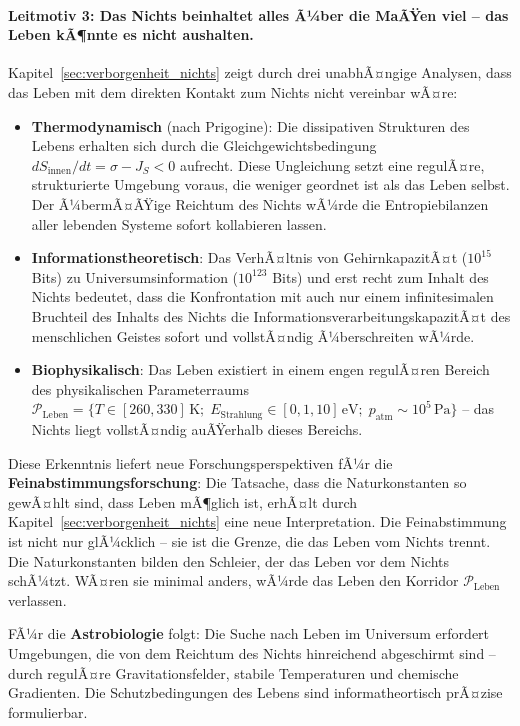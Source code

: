 ﻿\documentclass[12pt,a4paper]{report}
\begin{document}
\paragraph{Leitmotiv 3: Das Nichts beinhaltet alles Ã¼ber die MaÃŸen viel -- das Leben kÃ¶nnte es nicht aushalten.}

Kapitel~\ref{sec:verborgenheit_nichts} zeigt durch drei unabhÃ¤ngige Analysen, dass das Leben mit dem direkten Kontakt zum Nichts nicht vereinbar wÃ¤re:

\begin{itemize}
	\item \textbf{Thermodynamisch} (nach Prigogine): Die dissipativen Strukturen des Lebens erhalten sich durch die Gleichgewichtsbedingung $dS_{\text{innen}}/dt = \sigma - J_S < 0$ aufrecht. Diese Ungleichung setzt eine regulÃ¤re, strukturierte Umgebung voraus, die weniger geordnet ist als das Leben selbst. Der Ã¼bermÃ¤ÃŸige Reichtum des Nichts wÃ¼rde die Entropiebilanzen aller lebenden Systeme sofort kollabieren lassen.
	\item \textbf{Informationstheoretisch}: Das VerhÃ¤ltnis von GehirnkapazitÃ¤t ($10^{15}$ Bits) zu Universumsinformation ($10^{123}$ Bits) und erst recht zum Inhalt des Nichts bedeutet, dass die Konfrontation mit auch nur einem infinitesimalen Bruchteil des Inhalts des Nichts die InformationsverarbeitungskapazitÃ¤t des menschlichen Geistes sofort und vollstÃ¤ndig Ã¼berschreiten wÃ¼rde.
	\item \textbf{Biophysikalisch}: Das Leben existiert in einem engen regulÃ¤ren Bereich des physikalischen Parameterraums $\mathcal{P}_{\text{Leben}} = \{T \in [260, 330]\,\text{K};\; E_{\text{Strahlung}} \in [0{,}1, 10]\,\text{eV};\; p_{\text{atm}} \sim 10^5\,\text{Pa}\}$ -- das Nichts liegt vollstÃ¤ndig auÃŸerhalb dieses Bereichs.
\end{itemize}

Diese Erkenntnis liefert neue Forschungsperspektiven fÃ¼r die \textbf{Feinabstimmungsforschung}: Die Tatsache, dass die Naturkonstanten so gewÃ¤hlt sind, dass Leben mÃ¶glich ist, erhÃ¤lt durch Kapitel~\ref{sec:verborgenheit_nichts} eine neue Interpretation. Die Feinabstimmung ist nicht nur \glqq glÃ¼cklich\grqq{} -- sie ist die Grenze, die das Leben vom Nichts trennt. Die Naturkonstanten bilden den Schleier, der das Leben vor dem Nichts schÃ¼tzt. WÃ¤ren sie minimal anders, wÃ¼rde das Leben den Korridor $\mathcal{P}_{\text{Leben}}$ verlassen.

FÃ¼r die \textbf{Astrobiologie} folgt: Die Suche nach Leben im Universum erfordert Umgebungen, die von dem Reichtum des Nichts hinreichend abgeschirmt sind -- durch regulÃ¤re Gravitationsfelder, stabile Temperaturen und chemische Gradienten. Die Schutzbedingungen des Lebens sind informatheortisch prÃ¤zise formulierbar.
\end{document}
